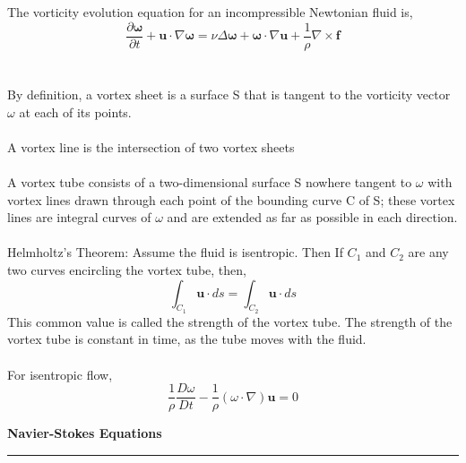 \documentclass[12pt]{article}
\begin{document}
\begin{flushleft}
\\~\\
The vorticity evolution equation for an incompressible Newtonian fluid is,
$$\frac{\partial \boldsymbol\omega}{\partial t}+\textbf{u}\cdot\nabla\boldsymbol\omega = \nu\Delta\boldsymbol\omega+\boldsymbol\omega\cdot\nabla\textbf{u}+\frac{1}{\rho}\nabla\times\textbf{f}$$
\\~\\
By definition, a vortex sheet is a surface S that is tangent to the vorticity vector $\omega$ at each of its points. 
\\~\\
A vortex line is the intersection of two vortex sheets
\\~\\
A vortex tube consists of a two-dimensional surface S nowhere tangent to $\omega$ with vortex lines drawn through each point of the bounding curve C of S; these vortex lines are integral curves of $\omega$ and are extended as far as possible in 
each direction.
\\~\\
Helmholtz's Theorem: Assume the fluid is isentropic. Then  If $C_1$ and $C_2$ are any two curves encircling the vortex tube, then,
$$\int_{C_1}\textbf{u}\cdot ds = \int_{C_2}\textbf{u}\cdot ds$$
This common value is called the strength of the vortex tube. The strength of the vortex tube is constant in time, as the tube moves with the fluid. 
\\~\\
For isentropic flow,
$$\frac{1}{\rho}\frac{D\omega}{Dt} - \frac{1}{\rho}(\omega\cdot\nabla)\textbf{u} = 0$$

\end{flushleft}

\pagebreak

\begin{huge}
\begin{center}
\textbf{Navier-Stokes Equations}
\noindent\rule{16.5cm}{0.4pt}
\end{center}
\end{huge}
\end{document}
